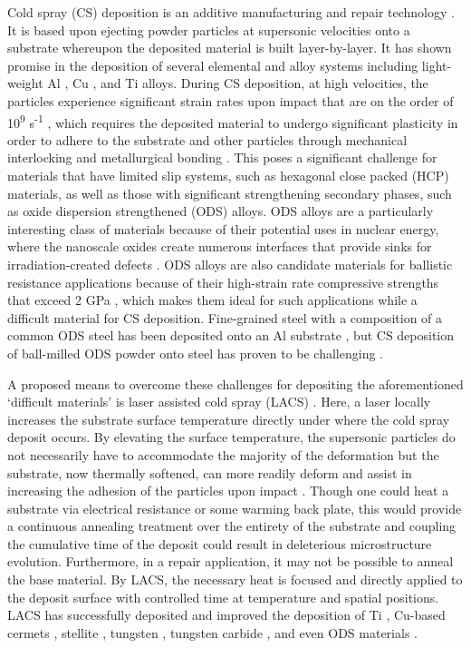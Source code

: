 	Cold spray (CS) deposition is an additive manufacturing and repair technology \cite{RN3390}. It is based upon ejecting powder particles at supersonic velocities onto a substrate whereupon the deposited material is built layer-by-layer. It has shown promise in the deposition of several elemental and alloy systems including light-weight Al \cite{RN641,RN626}, Cu \cite{RN1172,RN817}, and Ti \cite{RN2281,RN678} alloys. During CS deposition, at high velocities, the particles experience significant strain rates upon impact that are on the order of 10\textsuperscript{9} s\textsuperscript{-1} \cite{RN1687}, which requires the deposited material to undergo significant plasticity in order to adhere to the substrate and other particles through mechanical interlocking and metallurgical bonding \cite{RN486}. This poses a significant challenge for materials that have limited slip systems, such as hexagonal close packed (HCP) materials, as well as those with significant strengthening secondary phases, such as oxide dispersion strengthened (ODS) alloys. ODS alloys are a particularly interesting class of materials because of their potential uses in nuclear energy, where the nanoscale oxides create numerous interfaces that provide sinks for irradiation-created defects \cite{RN47,RN353}. ODS alloys are also candidate materials for ballistic resistance applications because of their high-strain rate compressive strengths that exceed 2 GPa \cite{RN267}, which makes them ideal for such applications while a difficult material for CS deposition. Fine-grained steel with a composition of a common ODS steel has been deposited onto an Al substrate \cite{RN378}, but CS deposition of ball-milled ODS powder onto steel has proven to be challenging \cite{RN383}.



	A proposed means to overcome these challenges for depositing the aforementioned ‘difficult materials’ is laser assisted cold spray (LACS) \cite{RN173,RN3366}. Here, a laser locally increases the substrate surface temperature directly under where the cold spray deposit occurs. By elevating the surface temperature, the supersonic particles do not necessarily have to accommodate the majority of the deformation but the substrate, now thermally softened, can more readily deform and assist in increasing the adhesion of the particles upon impact \cite{RN173}. Though one could heat a substrate via electrical resistance or some warming back plate, this would provide a continuous annealing treatment over the entirety of the substrate and coupling the cumulative time of the deposit could result in deleterious microstructure evolution. Furthermore, in a repair application, it may not be possible to anneal the base material. By LACS, the necessary heat is focused and directly applied to the deposit surface with controlled time at temperature and spatial positions. LACS has successfully deposited and improved the deposition of Ti \cite{RN173}, Cu-based cermets \cite{RN3366}, stellite \cite{RN191,RN135,RN780,RN1406,RN1392,RN1390}, tungsten \cite{RN156}, tungsten carbide \cite{RN2245}, and even ODS materials \cite{RN383}. 



